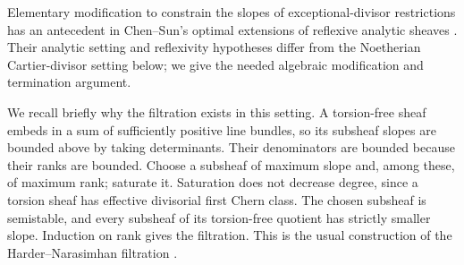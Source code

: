 \documentclass[11pt]{article}
\theoremstyle{remark}
\begin{document}
Elementary modification to constrain the slopes of exceptional-divisor
restrictions has an antecedent in Chen--Sun's optimal extensions of
reflexive analytic sheaves \cite[Theorem~1.4(I), Proposition~2.6 and
Remark~1.5]{ChenSun2020}. Their analytic setting and reflexivity
hypotheses differ from the Noetherian Cartier-divisor setting below;
we give the needed algebraic modification and termination argument.

We recall briefly why the filtration exists in this setting.
A torsion-free sheaf embeds in a sum of sufficiently positive line
bundles, so its subsheaf slopes are bounded above by taking determinants.
Their denominators are bounded because their ranks are bounded.
Choose a subsheaf of maximum slope and, among these, of maximum rank;
saturate it. Saturation does not decrease degree, since a torsion
sheaf has effective divisorial first Chern class. The chosen subsheaf
is semistable, and every subsheaf of its torsion-free quotient has
strictly smaller slope. Induction on rank gives the filtration.
This is the usual construction of the Harder--Narasimhan filtration
\cite[Section~1.6, Theorem~1.6.7 and Definition/Corollary~1.6.9]{HuybrechtsLehn}.
\end{document}
